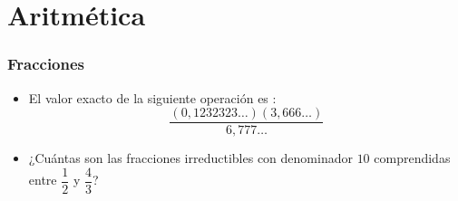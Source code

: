\documentclass[12pt, a5paper]{article}
\begin{document}
\section*{Aritmética}
\subsubsection*{Fracciones}

\begin{itemize}
\item{%
El valor exacto de la siguiente operación es :
$$
\dfrac{(0{,}1232323\ldots)(3{,}666\ldots)}{6{,}777\ldots}
$$
\begin{tasks}
\end{tasks}
}
\item{%
¿Cuántas son las fracciones irreductibles con denominador $10$ comprendidas entre $\dfrac{1}{2}$ y $\dfrac{4}{3}$?
\begin{tasks}
\end{tasks}
}
\end{itemize}
\end{document}

